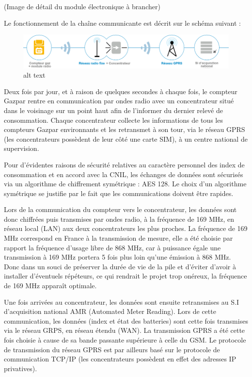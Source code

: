 \documentclass[
12pt,
french,                           %
a4paper,
]{article}
\begin{document}
(Image de détail du module électronique à brancher)

Le fonctionnement de la chaîne communicante est décrit sur le schéma
suivant :

\begin{figure}[htbp]
\centering
\includegraphics{chainemodule.png}
\caption{alt text}
\end{figure}

Deux fois par jour, et à raison de quelques secondes à chaque fois, le
compteur Gazpar rentre en communication par ondes radio avec un
concentrateur situé dans le voisinage sur un point haut afin de
l'informer du dernier relevé de consommation. Chaque concentrateur
collecte les informations de tous les compteurs Gazpar environnants et
les retransmet à son tour, via le réseau GPRS (les concentrateurs
possèdent de leur côté une carte SIM), à un centre national de
supervision.

Pour d'évidentes raisons de sécurité relatives au caractère personnel
des index de consommation et en accord avec la CNIL, les échanges de
données sont sécurisés via un algorithme de chiffrement symétrique : AES
128. Le choix d'un algorithme symétrique se justifie par le fait que les
communications doivent être rapides.

Lors de la communication du compteur vers le concentrateur, les données
sont donc chiffrées puis transmises par ondes radio, à la fréquence de
169 MHz, en réseau local (LAN) aux deux concentrateurs les plus proches.
La fréquence de 169 MHz correspond en France à la transmission de
mesure, elle a été choisie par rapport la fréquence d'usage libre de 868
MHz, car à puissance égale une transmission à 169 MHz portera 5 fois
plus loin qu'une émission à 868 MHz. Donc dans un souci de préserver la
durée de vie de la pile et d'éviter d'avoir à installer d'éventuels
répéteurs, ce qui rendrait le projet trop onéreux, la fréquence de 169
MHz apparaît optimale.

Une fois arrivées au concentrateur, les données sont ensuite
retransmises au S.I d'acquisition national AMR (Automated Meter
Reading). Lors de cette communication, les données (index et état des
batteries) sont cette fois transmises via le réseau GRPS, en réseau
étendu (WAN). La transmission GPRS a été cette fois choisie à cause de
sa bande passante supérieure à celle du GSM. Le protocole de
transmission du réseau GPRS est par ailleurs basé sur le protocole de
communication TCP/IP (les concentrateurs possèdent en effet des adresses
IP privatives).
\end{document}
